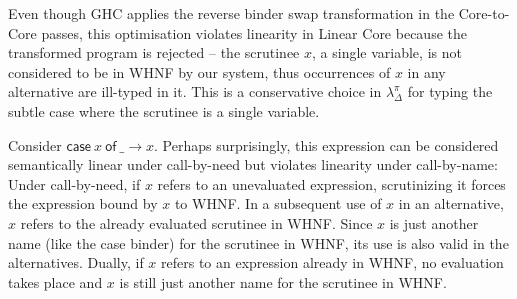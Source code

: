 \documentclass[acmsmall,review,screen]{acmart}
\newcommand{\llet}[2]{\mathsf{let}~#1~\mathsf{in}~#2}
\newcommand{\lletrec}[2]{\mathsf{letrec}~#1~\mathsf{in}~#2}
\newcommand{\ccase}[2]{\mathsf{case}~#1~\mathsf{of}~#2}
\begin{document}
%
%
%
Even though GHC applies the reverse binder swap transformation in the
Core-to-Core passes, this optimisation violates linearity in Linear Core
because the transformed program is rejected -- the scrutinee $x$, a single
variable, is not considered to be in WHNF by our system, thus occurrences of
$x$ in any alternative are ill-typed in it. This is a conservative choice in $\lambda^\pi_\Delta$ for
typing the subtle case where the scrutinee is a single variable.

Consider $\ccase{x}{\_ \to x}$. Perhaps surprisingly, this expression can be
considered semantically linear under call-by-need but violates
linearity under call-by-name:
%
Under call-by-need, if $x$ refers to an unevaluated expression, scrutinizing it forces the expression
bound by $x$ to WHNF. In a subsequent use of
$x$ in an alternative, $x$ refers to the already evaluated scrutinee in WHNF.
Since $x$ is just another name (like the case binder) for the scrutinee in
WHNF, its use is also valid in the alternatives.
%
Dually, if $x$ refers to an expression already in WHNF, no evaluation takes
place and $x$ is still just another name for the scrutinee in WHNF.
\end{document}
